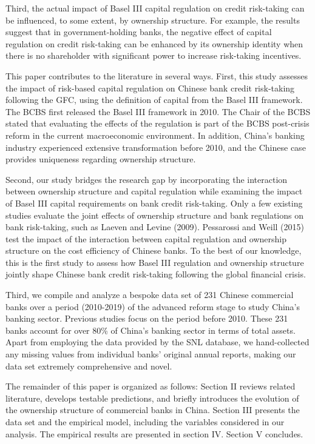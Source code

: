 \documentclass[
  12pt,
  a4paper,
]{scrreprt}
\begin{document}
Third, the actual impact of Basel III capital regulation on credit
risk-taking can be influenced, to some extent, by ownership structure.
For example, the results suggest that in government-holding banks, the
negative effect of capital regulation on credit risk-taking can be
enhanced by its ownership identity when there is no shareholder with
significant power to increase risk-taking incentives.

This paper contributes to the literature in several ways. First, this
study assesses the impact of risk-based capital regulation on Chinese
bank credit risk-taking following the GFC, using the definition of
capital from the Basel III framework. The BCBS first released the Basel
III framework in 2010. The Chair of the BCBS stated that evaluating the
effects of the regulation is part of the BCBS post-crisis reform in the
current macroeconomic environment. In addition, China's banking industry
experienced extensive transformation before 2010, and the Chinese case
provides uniqueness regarding ownership structure.

Second, our study bridges the research gap by incorporating the
interaction between ownership structure and capital regulation while
examining the impact of Basel III capital requirements on bank credit
risk-taking. Only a few existing studies evaluate the joint effects of
ownership structure and bank regulations on bank risk-taking, such as
Laeven and Levine (2009). Pessarossi and Weill (2015) test the impact of
the interaction between capital regulation and ownership structure on
the cost efficiency of Chinese banks. To the best of our knowledge, this
is the first study to assess how Basel III regulation and ownership
structure jointly shape Chinese bank credit risk-taking following the
global financial crisis.

Third, we compile and analyze a bespoke data set of 231 Chinese
commercial banks over a period (2010-2019) of the advanced reform stage
to study China's banking sector. Previous studies focus on the period
before 2010. These 231 banks account for over 80\% of China's banking
sector in terms of total assets. Apart from employing the data provided
by the SNL database, we hand-collected any missing values from
individual banks' original annual reports, making our data set extremely
comprehensive and novel.

The remainder of this paper is organized as follows: Section II reviews
related literature, develops testable predictions, and briefly
introduces the evolution of the ownership structure of commercial banks
in China. Section III presents the data set and the empirical model,
including the variables considered in our analysis. The empirical
results are presented in section IV. Section V concludes.
\end{document}
